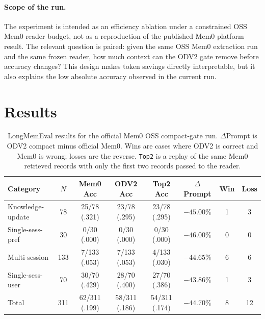 \documentclass{article}
\begin{document}
\paragraph{Scope of the run.}
The experiment is intended as an efficiency ablation under a constrained OSS Mem0 reader budget, not as a reproduction of the published Mem0 platform result. The relevant question is paired: given the same OSS Mem0 extraction run and the same frozen reader, how much context can the ODV2 gate remove before accuracy changes? This design makes token savings directly interpretable, but it also explains the low absolute accuracy observed in the current run.

\section{Results}

\begin{table}[t]
\caption{LongMemEval results for the official Mem0 OSS compact-gate run. $\Delta$Prompt is ODV2 compact minus official Mem0. Wins are cases where ODV2 is correct and Mem0 is wrong; losses are the reverse. \texttt{Top2} is a replay of the same Mem0 retrieved records with only the first two records passed to the reader.}
\label{tab:aggregate_results}
\vskip 0.15in
\begin{center}
\begin{small}
\begin{sc}
\begin{tabular}{lccccccc}
\toprule
Category & $N$ & Mem0 Acc & ODV2 Acc & Top2 Acc & $\Delta$Prompt & Win & Loss \\
\midrule
Knowledge-update & 78 & 25/78 (.321) & 23/78 (.295) & 23/78 (.295) & $-45.00\%$ & 1 & 3 \\
\midrule
Single-sess-pref & 30 & 0/30 (.000) & 0/30 (.000) & 0/30 (.000) & $-46.00\%$ & 0 & 0 \\
\midrule
Multi-session & 133 & 7/133 (.053) & 7/133 (.053) & 4/133 (.030) & $-44.65\%$ & 6 & 6 \\
\midrule
Single-sess-user & 70 & 30/70 (.429) & 28/70 (.400) & 27/70 (.386) & $-43.86\%$ & 1 & 3 \\
\midrule
Total & 311 & 62/311 (.199) & 58/311 (.186) & 54/311 (.174) & $-44.70\%$ & 8 & 12 \\
\bottomrule
\end{tabular}
\end{sc}
\end{small}
\end{center}
\vskip -0.1in
\end{table}
\end{document}
